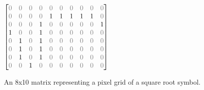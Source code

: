 \begin{figure}[H]
    \begin{center}
    $
    \begin{bmatrix} %
        \textcolor{gray}{0} & \textcolor{gray}{0} & \textcolor{gray}{0} & \textcolor{gray}{0} & \textcolor{gray}{0} & \textcolor{gray}{0} & \textcolor{gray}{0} & \textcolor{gray}{0} & \textcolor{gray}{0} & \textcolor{gray}{0} \\
        \textcolor{gray}{0} & \textcolor{gray}{0} & \textcolor{gray}{0} & \textcolor{gray}{0} & 1 & 1 & 1 & 1 & 1 & \textcolor{gray}{0} \\
        \textcolor{gray}{0} & \textcolor{gray}{0} & \textcolor{gray}{0} & 1 & \textcolor{gray}{0} & \textcolor{gray}{0} & \textcolor{gray}{0} & \textcolor{gray}{0} & \textcolor{gray}{0} & 1 \\
        1 & \textcolor{gray}{0} & \textcolor{gray}{0} & 1 & \textcolor{gray}{0} & \textcolor{gray}{0} & \textcolor{gray}{0} & \textcolor{gray}{0} & \textcolor{gray}{0} & \textcolor{gray}{0} \\
        \textcolor{gray}{0} & 1 & \textcolor{gray}{0} & 1 & \textcolor{gray}{0} & \textcolor{gray}{0} & \textcolor{gray}{0} & \textcolor{gray}{0} & \textcolor{gray}{0} & \textcolor{gray}{0} \\
        \textcolor{gray}{0} & 1 & \textcolor{gray}{0} & 1 & \textcolor{gray}{0} & \textcolor{gray}{0} & \textcolor{gray}{0} & \textcolor{gray}{0} & \textcolor{gray}{0} & \textcolor{gray}{0} \\
        \textcolor{gray}{0} & 1 & \textcolor{gray}{0} & 1 & \textcolor{gray}{0} & \textcolor{gray}{0} & \textcolor{gray}{0} & \textcolor{gray}{0} & \textcolor{gray}{0} & \textcolor{gray}{0} \\
        \textcolor{gray}{0} & \textcolor{gray}{0} & 1 & \textcolor{gray}{0} & \textcolor{gray}{0} & \textcolor{gray}{0} & \textcolor{gray}{0} & \textcolor{gray}{0} & \textcolor{gray}{0} & \textcolor{gray}{0} \\

    \end{bmatrix}
    $
    \end{center}
    \caption{An 8x10 matrix representing a pixel grid of a square root symbol.} %
    \label{fig:sqrt_matrix}
\end{figure}

